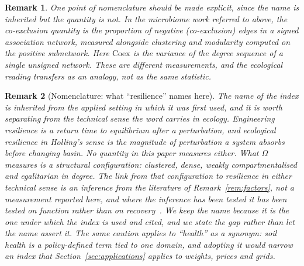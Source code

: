 \documentclass[11pt,a4paper]{article}
\newtheorem{remark}{Remark}
\begin{document}
\begin{remark}
One point of nomenclature should be made explicit, since the name is
inherited but the quantity is not. In the microbiome work referred to
above, the co-exclusion quantity is the \emph{proportion of negative
(co-exclusion) edges} in a signed association network, measured
alongside clustering and modularity computed on the positive
subnetwork. Here $\mathrm{Coex}$ is the variance of the degree sequence
of a single unsigned network. These are different measurements, and the
ecological reading transfers as an analogy, not as the same statistic.
\end{remark}

\begin{remark}[Nomenclature: what ``resilience'' names here]
\label{rem:nomenclature}
The name of the index is inherited from the applied setting in which it was
first used, and it is worth separating from the technical sense the word
carries in ecology. Engineering resilience is a return time to equilibrium
after a perturbation, and ecological resilience in Holling's sense is the
magnitude of perturbation a system absorbs before changing basin. \emph{No
quantity in this paper measures either.} What $\Omega$ measures is a
structural configuration: clustered, dense, weakly compartmentalised and
egalitarian in degree. The link from that configuration to resilience in
either technical sense is an inference from the literature of
Remark~\ref{rem:factors}, not a measurement reported here, and where the
inference has been tested it has been tested on function rather than on
recovery~\cite{wagg2019}. We keep the name because it is the one under which
the index is used and cited, and we state the gap rather than let the name
assert it. The same caution applies to ``health'' as a synonym: soil health
is a policy-defined term tied to one domain, and adopting it would narrow an
index that Section~\ref{sec:applications} applies to weights, prices and
grids.
\end{remark}
\end{document}
